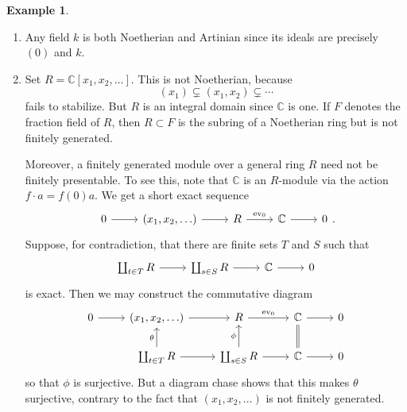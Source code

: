 \documentclass[10pt,letterpaper,cm]{nupset}
\theoremstyle{definition}
\newtheorem{exmp}{Example}
\newcommand{\C}{\mathbb C}
\newcommand{\1}{\mathbf{1}}
\newcommand{\0}{\vec 0}
\begin{document}
\begin{exmp} $ $
\begin{enumerate}
\item Any field $k$ is both Noetherian and Artinian since its ideals are precisely $(0)$ and $k$.
\item Set $R= \C[x_1, x_2, \ldots]$. This is not Noetherian, because $$(x_1) \subsetneq (x_1, x_2) \subsetneq \cdots   $$ fails to stabilize. But $R$ is an integral domain since $\C$ is one. If $F$ denotes the fraction field of $R$, then $R\subset F$ is the subring of a Noetherian ring but is not finitely generated. 

Moreover, a finitely generated module over a general ring $R$ need not be finitely presentable. To see this, note that $\C$ is an $R$-module via the action $f \cdot a = f(0)a$. We get a short exact sequence
\[
\begin{tikzcd}
0 \arrow[r] & {(x_1, x_2, \ldots)} \arrow[r] & R \arrow[r, "\text{ev}_0"] & \C \arrow[r] & 0
\end{tikzcd}
.\]
Suppose, for contradiction, that there are finite sets $T$ and $S$ such that 
\[ 
\begin{tikzcd}
 \coprod_{t\in T}R \arrow[r] & \coprod_{s\in S} R \arrow[r] & \C \arrow[r]  & 0
\end{tikzcd} 
\]  is  exact. 
Then we may construct the commutative diagram
\[
\begin{tikzcd}
0 \arrow[r] & {(x_1, x_2, \ldots)} \arrow[r] & R \arrow[r, "\text{ev}_0"] & \C \arrow[r] & 0 \\
 & \coprod_{t\in T}R \arrow[r] \arrow[u, "\theta"] & \coprod_{s\in S} R \arrow[r] \arrow[u, "\phi"] & \C \arrow[r] \arrow[u, equal] & 0
\end{tikzcd}
\] so that $\phi$ is surjective. But a diagram chase shows that this makes $\theta$ surjective, contrary to the fact that $(x_1, x_2, \ldots)$ is not finitely generated.
\end{enumerate}
\end{exmp}
\end{document}
